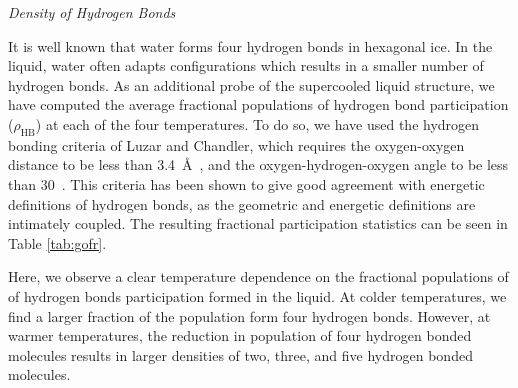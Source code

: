 \begin{flushleft}
\textit{Density of Hydrogen Bonds}
\end{flushleft}

It is well known that water forms four hydrogen bonds in hexagonal
ice. In the liquid, water often adapts configurations which results in
a smaller number of hydrogen bonds. As an additional probe of the
supercooled liquid structure, we have computed the average fractional
populations of hydrogen bond participation ($\rho_\mathrm{HB}$) at
each of the four temperatures. To do so, we have used the hydrogen
bonding criteria of Luzar and Chandler, which requires the
oxygen-oxygen distance to be less than 3.4~\AA~, and the
oxygen-hydrogen-oxygen angle to be less than
30\degree~.\cite{Luzar1996} This criteria has been shown to give good
agreement with energetic definitions of hydrogen bonds, as the
geometric and energetic definitions are intimately coupled. The
resulting fractional participation statistics can be seen in Table
\ref{tab:gofr}.



Here, we observe a clear temperature dependence on the fractional
populations of of hydrogen bonds participation formed in the
liquid. At colder temperatures, we find a larger fraction of the
population form four hydrogen bonds. However, at warmer temperatures,
the reduction in population of four hydrogen bonded molecules results
in larger densities of two, three, and five hydrogen bonded molecules.



